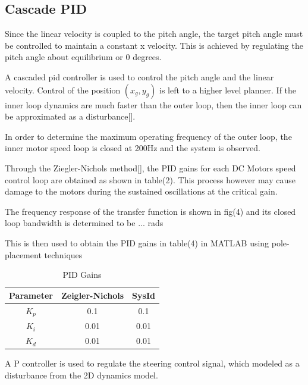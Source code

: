     

        \subsection{Cascade PID}
        Since the linear velocity is coupled to the
        pitch angle, the target pitch angle must be controlled to maintain a constant x velocity. 
        This is achieved by regulating the pitch angle about equilibrium or 0 degrees.

        A cascaded pid controller is used to control the pitch angle and the linear velocity. 
        Control of the position $(x_g,y_g)$ is left to a higher level planner.  
        If the inner loop dynamics are much faster than the outer loop, 
        then the inner loop can be approximated as a disturbance[].

        In order to determine the maximum operating frequency of the outer loop, 
        the inner motor speed loop is closed at 200Hz and the system is observed.
        
        Through the Ziegler-Nichols method[], the PID gains for each DC Motors speed control loop 
        are obtained as shown in table(2). This process however may cause damage to the motors 
        during the sustained oscillations at the critical gain. 
       
        The frequency response of the transfer function is shown in fig(4) 
        and its closed loop bandwidth is determined to be ... rads

        This is then used to obtain the PID gains in table(4) in MATLAB using pole-placement techniques
        \begin{table}[H]
            \centering
            \begin{tabular}{|c|c|c|}
                \hline
                Parameter & Zeigler-Nichols & SysId \\
                \hline 
                $K_p$ & 0.1 & 0.1 \\
                $K_i$ & 0.01 & 0.01 \\
                $K_d$ & 0.01 & 0.01 \\
                \hline
            \end{tabular}
            \caption{PID Gains}
        \end{table}

        A P controller is used to regulate the steering control signal, which modeled
        as a disturbance from the 2D dynamics model.

